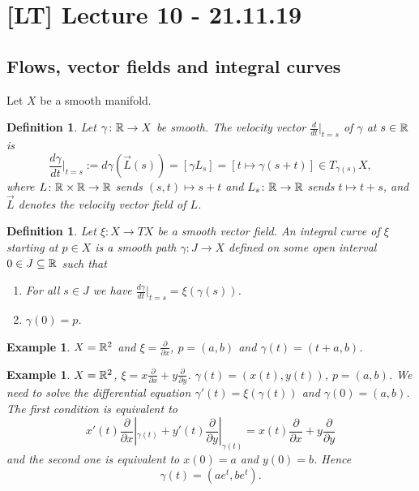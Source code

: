 \documentclass[A4paper, british, reqno]{amsart}
\theoremstyle{darkgreentheorem}
\theoremstyle{darkbluedefinition}
\newtheorem{defn}[thm]{Definition}
\theoremstyle{darkredexample}
\newtheorem{exa}[thm]{Example}
\theoremstyle{remark}
\newcommand{\1}{\mathbbm{1}}
\newcommand{\tms}{\times}
\newcommand{\sub}{\subseteq}
\begin{document}
\section{[LT] Lecture 10 - 21.11.19}

\subsection{Flows, vector fields and integral curves}

Let $X$ be a smooth manifold.

\begin{defn}
    Let $\gamma\colon \mathbb{R}\to X$ be smooth.
    The \textit{velocity vector} $\frac{d}{dt}|_{t=s}$ of $\gamma$ at $s\in \mathbb{R}$ is
    \[ \frac{d\gamma}{dt}|_{t=s}:=d\gamma(\vec{L}(s))=[\gamma L_{s}]=[t\mapsto \gamma(s+t)]\in T_{\gamma(s)}X, \]
    where $L\colon \R\tms \R\to \R$ sends $(s,t)\mapsto s+t$ and $L_{s}\colon \mathbb{R}\to \mathbb{R}$ sends $t\mapsto t
    +s$, and $\vec{L}$ denotes the velocity vector field of $L$.
\end{defn}

\begin{defn}
    Let $\xi\colon X\to TX$ be a smooth vector field.
    An \textit{integral curve} of $\xi$ starting at $p\in X$ is a smooth path $\gamma\colon J\to X$ defined on some open interval $0\in J\sub \R$ such that
    \begin{enumerate}
	\item For all $s\in J$ we have $\frac{d\gamma}{dt}|_{t=s}=\xi(\gamma(s))$.
	\item $\gamma(0)=p$.
    \end{enumerate}
\end{defn}

\begin{exa}
    $X=\mathbb{R}^{2}$ and $\xi=\frac{\partial}{\partial x}$, $p=(a,b)$ and $\gamma(t)=(t+a,b)$.
\end{exa}

\begin{exa}
    $X=\mathbb{R}^{2}$, $\xi=x\frac{\partial}{\partial x}+y\frac{\partial}{\partial y}$.
    $\gamma(t)=(x(t),y(t))$, $p=(a,b)$.
    We need to solve the differential equation $\gamma'(t)=\xi(\gamma(t))$ and $\gamma(0)=(a,b)$.
    The first condition is equivalent to
    \[ x'(t)\frac{\partial}{\partial x}|_{\gamma(t)}+y'(t)\frac{\partial }{\partial y}|_{\gamma(t)}=x(t)\frac{\partial }{\partial x} + y\frac{\partial }{\partial y} \]
    and the second one is equivalent to $x(0)=a$ and $y(0)=b$.
    Hence
    \[ \gamma(t)=(ae^{t},be^{t}).\]
\end{exa}
\end{document}
